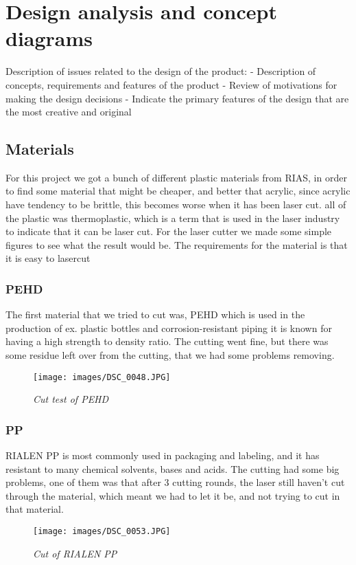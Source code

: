 \section{Design analysis and concept diagrams}
Description of issues related to the design of the product:
- Description of concepts, requirements and features of the product
- Review of motivations for making the design decisions
- Indicate the primary features of the design that are the most creative and original

\subsection{Materials}
For this project we got a bunch of different plastic materials from RIAS, in order to find some material that might be cheaper, and better that acrylic, since acrylic have tendency to be brittle, this becomes worse when it has been laser cut.
all of the plastic was thermoplastic, which is a term that is used in the laser industry to indicate that it can be laser cut.
For the laser cutter we made some simple figures to see what the result would be.
The requirements for the material is that it is easy to lasercut
\subsubsection{PEHD}
The first material that we tried to cut was, PEHD which is used in the production of ex. plastic bottles and corrosion-resistant piping it is known for having a high strength to density ratio.
The cutting went fine, but there was some residue left over from the cutting, that we had some problems removing.
\begin{figure}[h]
	\begin{center}
		\texttt{[image: images/DSC\_0048.JPG]}
		\caption{\small {\it {Cut test of PEHD}}} \label{fig:explode}
	\end{center}
\end{figure}
\subsubsection{ PP}
RIALEN PP is most commonly used in packaging and labeling, and it has resistant to many chemical solvents, bases and acids.
The cutting had some big problems, one of them was that after 3 cutting rounds, the laser still haven't cut through the material, which meant we had to let it be, and not trying to cut in that material.
\begin{figure}[h]
	\begin{center}
		\texttt{[image: images/DSC\_0053.JPG]}
		\caption{\small {\it {Cut of RIALEN PP}}} \label{fig:explode}
	\end{center}
\end{figure}
